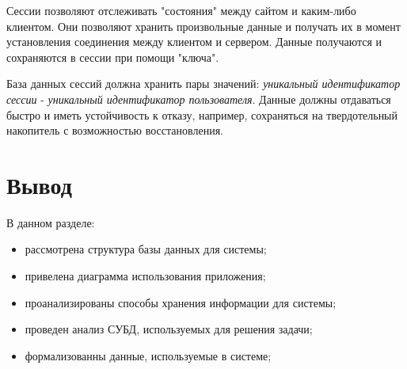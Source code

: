 Сессии\cite{sessions} позволяют отслеживать "состояния" между сайтом и каким-либо клиентом.
Они позволяют хранить произвольные данные и получать их в момент установления соединения между клиентом и сервером.
Данные получаются и сохраняются в сессии при помощи "ключа".

База данных сессий должна хранить пары значений: \textit{уникальный идентификатор сессии} - \textit{уникальный идентификатор пользователя}.
Данные должны отдаваться быстро и иметь устойчивость к отказу, например, сохраняться на твердотельный накопитель с возможностью восстановления.

\section{Вывод}

В данном разделе:

\begin{itemize}
    \item рассмотрена структура базы данных для системы;
    \item привелена диаграмма использования приложения;
    \item проанализированы способы хранения информации для системы;
    \item проведен анализ СУБД, используемых для решения задачи;
    \item формализованны данные, используемые в системе;
\end{itemize}
